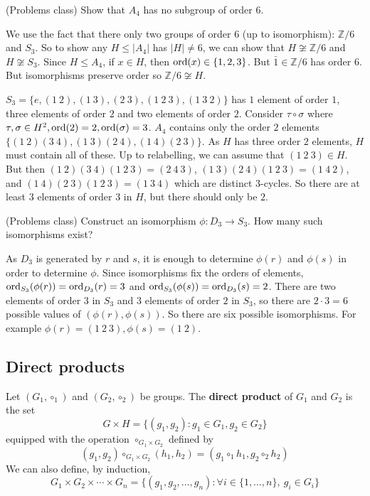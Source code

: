 \begin{example}
	(Problems class) Show that $A_4$ has no subgroup of order $6$.

	We use the fact that there only two groups of order $6$ (up to isomorphism): $\mathbb{Z} / 6$ and $S_3$. So to show any $H \le |A_4|$ has $|H| \ne 6$, we can show that $H \not\cong \mathbb{Z} / 6$ and $H \not\cong S_3$. Since $H \le A_4$, if $x \in H$, then $\text{ord}(x) \in \{ 1, 2, 3 \}$. But $\bar{1} \in \mathbb{Z} / 6$ has order $6$. But isomorphisms preserve order so $\mathbb{Z} / 6 \not\cong H$.

	$S_3 = \{ e, (1 \ 2), (1 \ 3), (2 \ 3), (1 \ 2 \ 3), (1 \ 3 \ 2) \}$ has $1$ element of order $1$, three elements of order $2$ and two elements of order $2$. Consider $\tau \circ \sigma$ where $\tau, \sigma \in H^2, \text{ord}(2) = 2, \text{ord}(\sigma) = 3$. $A_4$ contains only the order $2$ elements $\{ (1 \ 2) (3 \ 4), (1 \ 3) (2 \ 4), (1 \ 4) (2 \ 3) \}$. As $H$ has three order $2$ elements, $H$ must contain all of these. Up to relabelling, we can assume that $(1 \ 2 \ 3) \in H$. But then $(1 \ 2) (3 \ 4) (1 \ 2 \ 3) = (2 \ 4 \ 3)$, $(1 \ 3) (2 \ 4) (1 \ 2 \ 3) = (1 \ 4 \ 2)$, and $(1 \ 4) (2 \ 3) (1 \ 2 \ 3) = (1 \ 3 \ 4)$ which are distinct $3$-cycles. So there are at least $3$ elements of order $3$ in $H$, but there should only be $2$.
\end{example}

\begin{example}
	(Problems class) Construct an isomorphism $\phi: D_3 \rightarrow S_3$. How many such isomorphisms exist?

	As $D_3$ is generated by $r$ and $s$, it is enough to determine $\phi(r)$ and $\phi(s)$ in order to determine $\phi$. Since isomorphisms fix the orders of elements, $\text{ord}_{S_3}(\phi(r)) = \text{ord}_{D_3}(r) = 3$ and $\text{ord}_{S_3}(\phi(s)) = \text{ord}_{D_3}(s) = 2$. There are two elements of order $3$ in $S_3$ and $3$ elements of order $2$ in $S_3$, so there are $2 \cdot 3 = 6$ possible values of $(\phi(r), \phi(s))$. So there are six possible isomorphisms. For example $\phi(r) = (1 \ 2 \ 3), \phi(s) = (1 \ 2)$.
\end{example}

\subsection{Direct products}

\begin{definition}
	Let $(G_1, \circ_1)$ and $(G_2, \circ_2)$ be groups. The \textbf{direct product} of $G_1$ and $G_2$ is the set
	\[
		G \times H = \{ (g_1, g_2): g_1 \in G_1, g_2 \in G_2 \}
	\]
	equipped with the operation $\circ_{G_1 \times G_2}$ defined by
	\[
		(g_1, g_2) \circ_{G_1 \times G_2} (h_1, h_2) = (g_1 \circ_1 h_1, g_2 \circ_2 h_2)
	\]
	We can also define, by induction,
	\[
		G_1 \times G_2 \times \cdots \times G_n = \{ (g_1, g_2, \ldots, g_n): \forall i \in \{ 1, \dots, n \}, \ g_i \in G_i \}
	\]
\end{definition}

